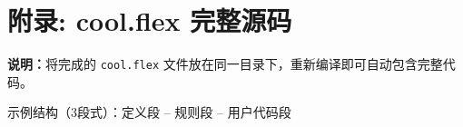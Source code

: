 \documentclass[twocolumn]{article}
\begin{document}
\textcolor{red}{%
}


\appendix
\section{附录: cool.flex 完整源码}
\label{sec:appendix_code}

\textcolor{red}{%
}

  {}
  {
\textbf{说明：}将完成的 \texttt{cool.flex} 文件放在同一目录下，重新编译即可自动包含完整代码。

示例结构（3段式）：定义段 -- 规则段 -- 用户代码段
}
\end{document}

